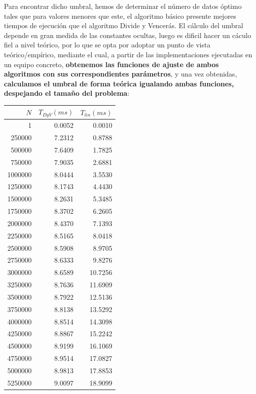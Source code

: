 Para encontrar dicho umbral, hemos de determinar el número de datos óptimo tales que para valores menores que este, el algoritmo básico 
presente mejores tiempos de ejecución que el algoritmo Divide y Vencerás. El cálculo del umbral depende en gran medida de las constantes ocultas, 
luego es dificil hacer un cáculo fiel a nivel teórico, por lo que se opta por adoptar un punto de vista teórico/empírico, mediante el cual, a partir de las 
implementaciones ejecutadas en un equipo concreto, \textbf{obtenemos las funciones de ajuste de ambos algoritmos con sus correspondientes 
parámetros}, y una vez obtenidas, \textbf{calculamos el umbral de forma teórica igualando ambas funciones, despejando el tamaño del problema}: 

\newpage

\begin{table}
	\footnotesize
	\centering
	\begin{tabular}{|r|r|r|}
		\hline
		$N$ & $T_{DyV} (ms)$ & $T_{lin} (ms)$ \\
		\hline
		1 & 0.0052 & 0.0010 \\ 
		250000 & 7.2312 & 0.8788 \\ 
		500000 & 7.6409 & 1.7825 \\ 
		750000 & 7.9035 & 2.6881 \\ 
		1000000 & 8.0444 & 3.5530 \\ 
		1250000 & 8.1743 & 4.4430 \\ 
		1500000 & 8.2631 & 5.3485 \\ 
		1750000 & 8.3702 & 6.2605 \\ 
		2000000 & 8.4370 & 7.1393 \\ 
		2250000 & 8.5165 & 8.0418 \\ 
		2500000 & 8.5908 & 8.9705 \\ 
		2750000 & 8.6333 & 9.8276 \\ 
		3000000 & 8.6589 & 10.7256 \\ 
		3250000 & 8.7636 & 11.6909 \\ 
		3500000 & 8.7922 & 12.5136 \\ 
		3750000 & 8.8138 & 13.5292 \\ 
		4000000 & 8.8514 & 14.3098 \\ 
		4250000 & 8.8867 & 15.2242 \\ 
		4500000 & 8.9199 & 16.1069 \\ 
		4750000 & 8.9514 & 17.0827 \\ 
		5000000 & 8.9813 & 17.8853 \\ 
		5250000 & 9.0097 & 18.9099 \\ 

\end{tabular}
\end{table}
